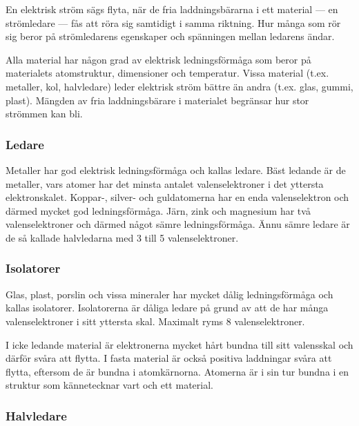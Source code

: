 En elektrisk ström sägs flyta, när de fria laddningsbärarna i ett material --- en
strömledare --- fås att röra sig samtidigt i samma riktning.
Hur många som rör sig beror på strömledarens egenskaper och spänningen mellan
ledarens ändar.

Alla material har någon grad av elektrisk ledningsförmåga som beror på
materialets atomstruktur, dimensioner och temperatur.
Vissa material (t.ex. metaller, kol, halvledare) leder elektrisk ström bättre
än andra (t.ex. glas, gummi, plast).
Mängden av fria laddningsbärare i materialet begränsar hur stor strömmen kan
bli.

\subsubsection{Ledare}

Metaller har god elektrisk ledningsförmåga och kallas ledare.
Bäst ledande är de metaller, vars atomer har det minsta antalet
valenselektroner i det yttersta elektronskalet.
Koppar-, silver- och guldatomerna har en enda valenselektron och därmed mycket
god ledningsförmåga.
Järn, zink och magnesium har två valenselektroner och därmed något sämre
ledningsförmåga.
Ännu sämre ledare är de så kallade halvledarna med 3 till 5 valenselektroner.

\subsubsection{Isolatorer}

Glas, plast, porslin och vissa mineraler har mycket dålig ledningsförmåga och
kallas isolatorer.
Isolatorerna är dåliga ledare på grund av att de har många valenselektroner i
sitt yttersta skal.
Maximalt ryms 8 valenselektroner.

I icke ledande material är elektronerna mycket hårt bundna till sitt valensskal
och därför svåra att flytta.
I fasta material är också positiva laddningar svåra att flytta, eftersom de är
bundna i atomkärnorna.
Atomerna är i sin tur bundna i en struktur som kännetecknar vart och ett
material.

\subsubsection{Halvledare}

